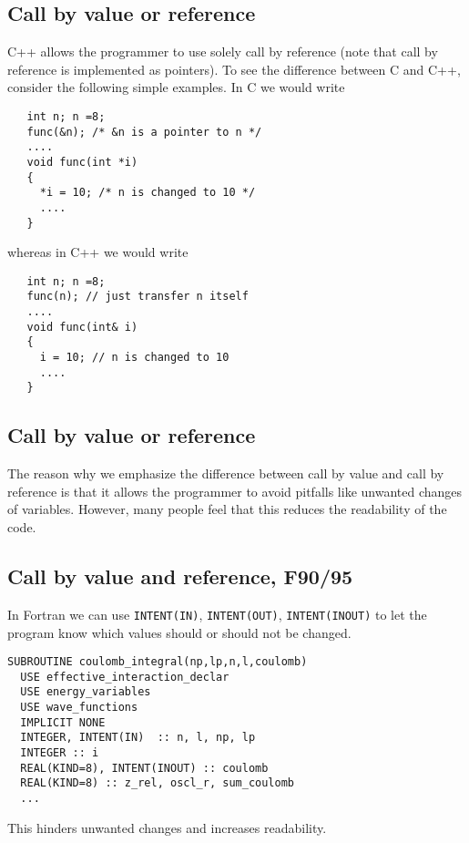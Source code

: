 \documentclass[%
oneside,                 %
final,                   %
10pt]{article}
\begin{document}
\subsection*{Call by value or reference}
C++ allows the programmer to use solely call by reference (note that call by reference is implemented as pointers). To see the difference between C and C++, consider the following simple examples.
In C we would write

\begin{verbatim}
   int n; n =8;
   func(&n); /* &n is a pointer to n */
   ....
   void func(int *i)
   {
     *i = 10; /* n is changed to 10 */
     ....
   }
\end{verbatim}
whereas in C++ we would write
\begin{verbatim}
   int n; n =8;
   func(n); // just transfer n itself
   ....
   void func(int& i)
   {
     i = 10; // n is changed to 10
     ....
   }
\end{verbatim}


\subsection*{Call by value or reference}
The reason why we emphasize the difference between call by value and call
by reference is that it allows the programmer to avoid pitfalls
like unwanted changes of variables. However, many people feel that this
reduces the readability of the code.


\subsection*{Call by value and reference, F90/95}

In Fortran we can use \Verb!INTENT(IN)!, \Verb!INTENT(OUT)!, \Verb!INTENT(INOUT)! to let the
program know which values should or should not be changed.

\begin{verbatim}
SUBROUTINE coulomb_integral(np,lp,n,l,coulomb)
  USE effective_interaction_declar
  USE energy_variables
  USE wave_functions
  IMPLICIT NONE
  INTEGER, INTENT(IN)  :: n, l, np, lp
  INTEGER :: i
  REAL(KIND=8), INTENT(INOUT) :: coulomb
  REAL(KIND=8) :: z_rel, oscl_r, sum_coulomb
  ...
\end{verbatim}
This hinders unwanted changes and increases readability.
\end{document}
